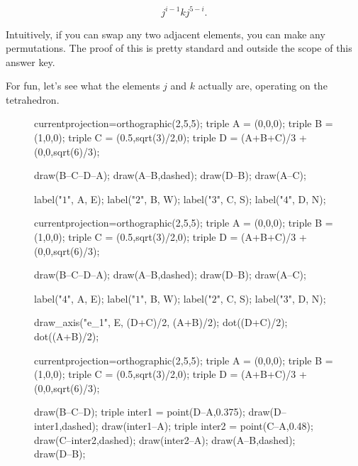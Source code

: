 \documentclass[../key.tex]{subfiles}
\begin{document}
$$j^{i-1}kj^{5-i}.$$

\noindent Intuitively, if you can swap any two adjacent elements, you can make any permutations. The proof of this is pretty standard and outside the scope of this answer key.

For fun, let's see what the elements $j$ and $k$ actually are, operating on the tetrahedron.

\begin{figure}[h]
	\begin{center}
		\begin{minipage}{0.3\textwidth}
			\centering
			\begin{asy}[width=0.9\textwidth]
			currentprojection=orthographic(2,5,5);
			triple A = (0,0,0);
			triple B = (1,0,0);
			triple C = (0.5,sqrt(3)/2,0);
			triple D = (A+B+C)/3 + (0,0,sqrt(6)/3);
			
			draw(B--C--D--A);
			draw(A--B,dashed);
			draw(D--B);
			draw(A--C);
			
			label("$1$", A, E);
			label("$2$", B, W);
			label("$3$", C, S);
			label("$4$", D, N);
			\end{asy}
		\end{minipage}
		\hfill
		\begin{minipage}{0.3\textwidth}
			\centering
			\begin{asy}[width=0.9\textwidth]
			currentprojection=orthographic(2,5,5);
			triple A = (0,0,0);
			triple B = (1,0,0);
			triple C = (0.5,sqrt(3)/2,0);
			triple D = (A+B+C)/3 + (0,0,sqrt(6)/3);
			
			draw(B--C--D--A);
			draw(A--B,dashed);
			draw(D--B);
			draw(A--C);
			
			label("$4$", A, E);
			label("$1$", B, W);
			label("$2$", C, S);
			label("$3$", D, N);
			
			draw_axis("e_1", E, (D+C)/2, (A+B)/2);
			dot((D+C)/2);
			dot((A+B)/2);
			\end{asy}
		\end{minipage}
		\hfill
		\begin{minipage}{0.3\textwidth}
			\centering
			\begin{asy}[width=0.9\textwidth]
			currentprojection=orthographic(2,5,5);
			triple A = (0,0,0);
			triple B = (1,0,0);
			triple C = (0.5,sqrt(3)/2,0);
			triple D = (A+B+C)/3 + (0,0,sqrt(6)/3);
			
			draw(B--C--D);
			triple inter1 = point(D--A,0.375);
			draw(D--inter1,dashed);
			draw(inter1--A);
			triple inter2 = point(C--A,0.48);
			draw(C--inter2,dashed);
			draw(inter2--A);
			draw(A--B,dashed);
			draw(D--B);
			

\end{asy}
\end{minipage}
\end{center}
\end{figure}
\end{document}
